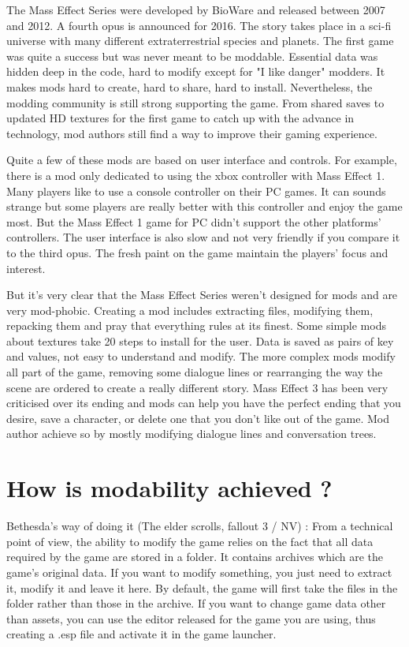 \documentclass[a4paper,12pt]{article}
\begin{document}
The Mass Effect Series were developed by BioWare and released between 2007 and 2012. A fourth opus is announced for 2016. The story takes place in a sci-fi universe with many different extraterrestrial species and planets. The first game was quite a success but was never meant to be moddable. Essential data was hidden deep in the code, hard to modify except for "I like danger" modders. It makes mods hard to create, hard to share, hard to install. Nevertheless, the modding community is still strong supporting the game. From shared saves to updated HD textures for the first game to catch up with the advance in technology, mod authors still find a way to improve their gaming experience.

Quite a few of these mods are based on user interface and controls. For example, there is a mod only dedicated to using the xbox controller with Mass Effect 1. Many players like to use a console controller on their PC games. It can sounds strange but some players are really better with this controller and enjoy the game most. But the Mass Effect 1 game for PC didn't support the other platforms' controllers. The user interface is also slow and not very friendly if you compare it to the third opus. The fresh paint on the game maintain the players' focus and interest.

But it's very clear that the Mass Effect Series weren't designed for mods and are very mod-phobic. Creating a mod includes extracting files, modifying them,  repacking them and pray that everything rules at its finest. Some simple mods about textures take 20 steps to install for the user. Data is saved as pairs of key and values, not easy to understand and modify. The more complex mods modify all part of the game, removing some dialogue lines or rearranging the way the scene are ordered to create a really different story. Mass Effect 3 has been very criticised over its ending and mods can help you have the perfect ending that you desire, save a character, or delete one that you don't like out of the game. Mod author achieve so by mostly modifying dialogue lines and conversation trees.

\newpage
\section{How is modability achieved ?}

Bethesda's way of doing it (The elder scrolls, fallout 3 / NV) : From a technical point of view, the ability to modify the game relies on the fact that all data required by the game are stored in a folder. It contains archives which are the game's original data. If you want to modify something, you just need to extract it, modify it and leave it here. By default, the game will first take the files in the folder rather than those in the archive. If you want to change game data other than assets, you can use the editor released for the game you are using, thus creating a .esp file and activate it in the game launcher.
\end{document}
